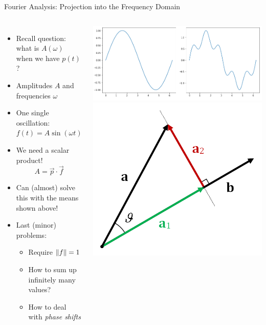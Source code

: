\begin{frame}{Fourier Analysis: Projection into the Frequency Domain}
%
\begin{columns}[T]
\begin{itemize}
\item Recall question: what is $A(\omega)$ when we have $p(t)$?
\item Amplitudes $A$ and frequencies $\omega$
\item One single oscillation: $f(t) = A \sin(\omega t)$
\item[\Thus] We need a scalar product!
	\[ A = \vec{p} \cdot \vec{f} \]
\item Can (almost) solve this with the means shown above!
\item Last (minor) problems:
	\begin{itemize}
	\item Require $\norm{f} = 1$
	\item How to sum up infinitely many values?
	\item How to deal with \emph{phase shifts}
	\end{itemize}
\end{itemize}
%
\begin{center}
	\includegraphics[width=\linewidth]{./gfx/sine-superposition-sbs}
	\includegraphics[width=.8\linewidth]{./gfx/Projection}
\end{center}
\end{columns}
%
\end{frame}

